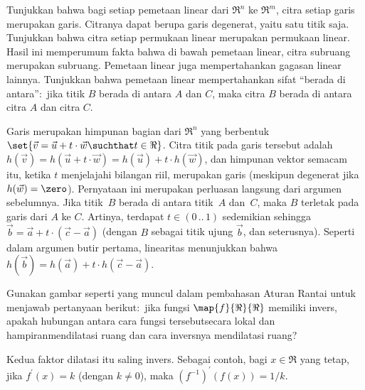 \begin{exercises}
    \begin{exparts}
      \partsitem Tunjukkan bahwa bagi setiap pemetaan linear dari $\Re^n$ ke
         $\Re^m$, citra setiap garis merupakan garis.
         Citranya dapat berupa garis degenerat, yaitu satu titik saja.
      \partsitem Tunjukkan bahwa citra setiap permukaan linear merupakan
         permukaan linear. Hasil ini memperumum fakta bahwa di bawah pemetaan
         linear, citra subruang merupakan subruang.
      \partsitem Pemetaan linear juga mempertahankan gagasan linear lainnya.
         Tunjukkan bahwa pemetaan linear mempertahankan sifat ``berada di
         antara'':~jika titik $B$ berada di antara $A$ dan $C$, maka citra $B$
         berada di antara citra $A$ dan citra $C$.
    \end{exparts}
    \begin{answer}
      \begin{exparts}
        \partsitem Garis merupakan himpunan bagian dari $\Re^n$ yang berbentuk
          $\set{\vec{v}=\vec{u}+t\cdot\vec{w}\suchthat t\in\Re}$.
          Citra titik pada garis tersebut adalah
          $h(\vec{v})=h(\vec{u}+t\cdot\vec{w})=h(\vec{u})+t\cdot h(\vec{w})$,
          dan himpunan vektor semacam itu, ketika $t$ menjelajahi bilangan riil,
          merupakan garis (meskipun degenerat jika $h(\vec{w})=\zero$).
        \partsitem Pernyataan ini merupakan perluasan langsung dari argumen
          sebelumnya.
        \partsitem Jika titik~$B$ berada di antara titik~$A$ dan~$C$, maka $B$
          terletak pada garis dari $A$ ke $C$.
          Artinya, terdapat $t\in (0\,..\,1)$ sedemikian sehingga
          $\vec{b}=\vec{a}+t\cdot (\vec{c}-\vec{a})$ (dengan $B$ sebagai titik
          ujung $\vec{b}$, dan seterusnya).
          Seperti dalam argumen butir pertama, linearitas menunjukkan bahwa
          $h(\vec{b})=h(\vec{a})+t\cdot h(\vec{c}-\vec{a})$.
      \end{exparts}
    \end{answer}
  \item 
    Gunakan gambar seperti yang muncul dalam pembahasan Aturan Rantai untuk
    menjawab pertanyaan berikut:~jika fungsi $\map{f}{\Re}{\Re}$ memiliki
    invers, apakah hubungan antara cara fungsi tersebut\Dash secara lokal dan
    hampiran\Dash mendilatasi ruang dan cara inversnya mendilatasi ruang?
    \begin{answer}
      Kedua faktor dilatasi itu saling invers.
      Sebagai contoh, bagi $x\in\Re$ yang tetap, jika $f^\prime (x)=k$ (dengan
      $k\neq 0$), maka $(f^{-1})^\prime (f(x))=1/k$.

\end{answer}
\end{exercises}
